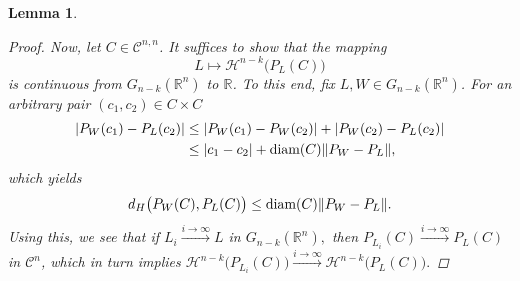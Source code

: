 \documentclass[pdflatex,sn-mathphys-num]{sn-jnl}
\theoremstyle{plain}
\newtheorem{lemma}[theorem]{Lemma}
\theoremstyle{definition}
\DeclareMathOperator{\diam}{\textup{diam}}
\begin{document}
\begin{lemma}
\begin{proof}
        Now, let $C\in\mathcal{C}^{n, n}$. It suffices to show that the mapping $$L\mapsto \mathcal{H}^{n-k}\big(P_L(C)\big)$$ is continuous from $G_{n-k}(\mathbb{R}^n)$ to $\mathbb{R}$. To this end, fix $L, W\in G_{n-k}(\mathbb{R}^n)$. For an arbitrary pair $(c_1, c_2)\in C\times C$\begin{equation*}
            \begin{split}|P_W(c_1)-P_L(c_2)|&\leq  |P_W(c_1)-P_W(c_2)|+|P_W(c_2)-P_L(c_2)|\\&\leq |c_1-c_2|+\diam(C)\Vert P_W-P_L\Vert,\end{split}
        \end{equation*} which yields $$d_H\big(P_W(C), P_L(C)\big)\leq\diam(C)\Vert P_W-P_L\Vert.$$ Using this, we see that if $L_i\xrightarrow{i\to\infty} L$ in $G_{n-k}(\mathbb{R}^n),$ then $P_{L_{i}}(C)\xrightarrow{i\to\infty}P_{L}(C)$ in $\mathcal{C}^n$, which in turn implies $\mathcal{H}^{n-k}\big(P_{L_{i}}(C)\big)\xrightarrow{i\to\infty}\mathcal{H}^{n-k}\big(P_{L}(C)\big).$
    \end{proof}
\end{lemma}
\end{document}
